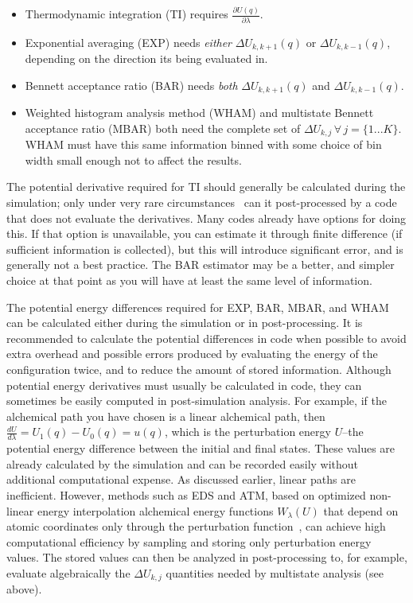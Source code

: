\begin{itemize}
    \item Thermodynamic integration (TI) requires $\frac{\partial U(q)}{\partial\lambda}$.
    \item Exponential averaging (EXP) needs \textit{either} $\Delta U_{k,k+1}(q)$ or $\Delta U_{k,k-1}(q)$, depending on the direction its being evaluated in.
    \item Bennett acceptance ratio (BAR) needs \textit{both} $\Delta U_{k,k+1}(q)$ and $\Delta U_{k,k-1}(q)$.
    \item Weighted histogram analysis method (WHAM) and multistate Bennett acceptance ratio (MBAR) both need the complete set of $\Delta U_{k,j} \, \forall \, j=\{1...K\}$. WHAM must have this same information binned with some choice of bin width small enough not to affect the results.
\end{itemize}

The potential derivative required for TI should generally be calculated during the simulation; only under very rare circumstances~\cite{naden2015linear} can it post-processed by a code that does not evaluate the derivatives. Many codes already have options for doing this.
If that option is unavailable, you can estimate it through finite difference (if sufficient information is collected), but this will introduce significant error, and is generally not a best practice. The BAR estimator may be a better, and simpler choice at that point as you will have at least the same level of information. 

The potential energy differences required for EXP, BAR, MBAR, and WHAM can be calculated either during the simulation or in post-processing. It is recommended to calculate the potential differences in code when possible to avoid extra overhead and possible errors produced by evaluating the energy of the configuration twice, and to reduce the amount of stored information. 
Although potential energy derivatives must usually be calculated in code, they can sometimes be easily computed in post-simulation analysis. 
For example, if the alchemical path you have chosen is a linear alchemical path, then $\frac{dU}{d\lambda} = U_1(q) - U_0(q) = u(q)$, which is the perturbation energy $U$--the potential energy difference between the initial and final states. These values are already calculated by the simulation and can be recorded easily without additional computational expense. As discussed earlier, linear paths are inefficient. However, methods such as EDS and ATM, based on optimized non-linear energy interpolation alchemical energy functions $W_\lambda(U)$ that depend on atomic coordinates only through the perturbation function~\cite{konig2021efficient,azimi2022relative}, can achieve high computational efficiency by sampling and storing only perturbation energy values. The stored values can then be analyzed in post-processing to, for example, evaluate algebraically the $\Delta U_{k,j}$ quantities needed by multistate analysis (see above). 

